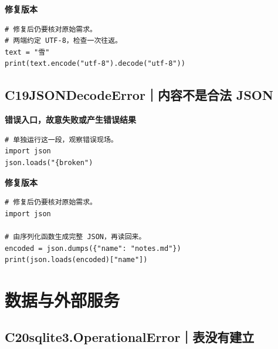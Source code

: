 \textbf{修复版本}

\begin{lstlisting}[title={\code{case_18.py}}]
# 修复后仍要核对原始需求。
# 两端约定 UTF-8，检查一次往返。
text = "雪"
print(text.encode("utf-8").decode("utf-8"))
\end{lstlisting}


\subsection*{C19\enspace JSONDecodeError｜内容不是合法 JSON}





\textbf{错误入口，故意失败或产生错误结果}

\begin{lstlisting}[style=errorcode,title={错误复现（故意失败或错误结果）：\code{case_19_bad.py.txt}}]
# 单独运行这一段，观察错误现场。
import json
json.loads("{broken")
\end{lstlisting}

\textbf{修复版本}

\begin{lstlisting}[title={\code{case_19.py}}]
# 修复后仍要核对原始需求。
import json

# 由序列化函数生成完整 JSON，再读回来。
encoded = json.dumps({"name": "notes.md"})
print(json.loads(encoded)["name"])
\end{lstlisting}


\section{数据与外部服务}

\subsection*{C20\enspace sqlite3.OperationalError｜表没有建立}

